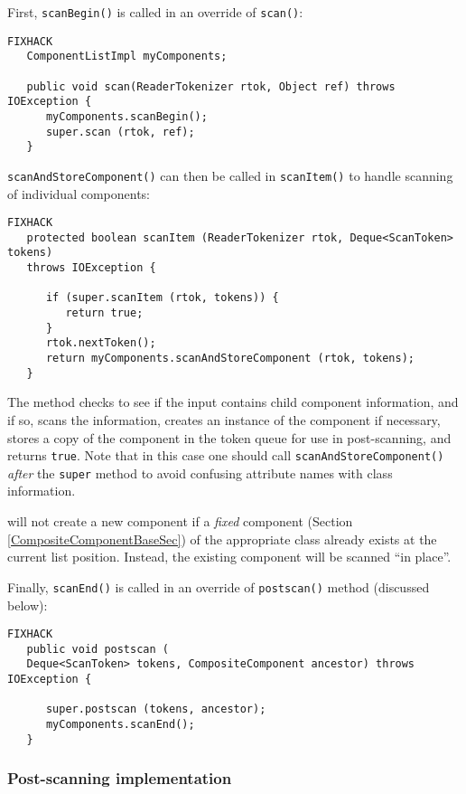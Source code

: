 \documentclass{article}
\begin{document}
First, {\tt scanBegin()} is called in an override of {\tt scan()}:
\begin{lstlisting}FIXHACK
   ComponentListImpl myComponents; 

   public void scan(ReaderTokenizer rtok, Object ref) throws IOException {
      myComponents.scanBegin();
      super.scan (rtok, ref);
   }
\end{lstlisting}

{\tt scanAndStoreComponent()} can then be called in {\tt scanItem()} to
handle scanning of individual components:
\begin{lstlisting}FIXHACK
   protected boolean scanItem (ReaderTokenizer rtok, Deque<ScanToken> tokens)
   throws IOException {

      if (super.scanItem (rtok, tokens)) {
         return true;
      }
      rtok.nextToken();
      return myComponents.scanAndStoreComponent (rtok, tokens);
   }
\end{lstlisting}
The method checks to see if the input contains child component
information, and if so, scans the information, creates an instance of
the component if necessary, stores a copy of the component
in the token queue for use in post-scanning, and returns 
{\tt true}.
Note that in this case one should call {\tt scanAndStoreComponent()} {\it after}
the {\tt super} method to avoid confusing attribute names with class
information.

\begin{sideblock}
will not create a new component if a {\it fixed} component (Section
\ref{CompositeComponentBaseSec}) of the appropriate class already
exists at the current list position. Instead, the existing component
will be scanned ``in place''.
\end{sideblock}

Finally, {\tt scanEnd()} is called in an override of {\tt postscan()}
method (discussed below):
\begin{lstlisting}FIXHACK
   public void postscan (
   Deque<ScanToken> tokens, CompositeComponent ancestor) throws IOException {

      super.postscan (tokens, ancestor);
      myComponents.scanEnd();
   }
\end{lstlisting}

\subsubsection{Post-scanning implementation}
\end{document}
